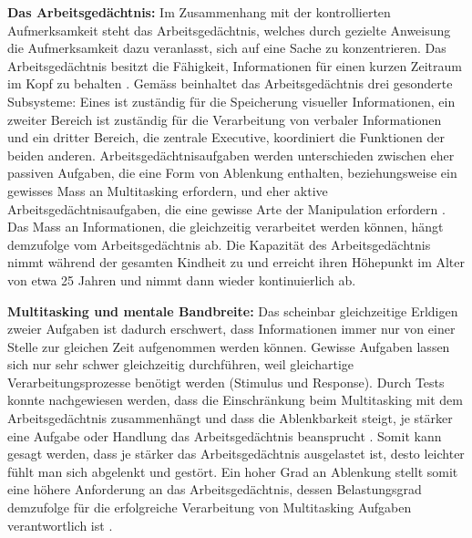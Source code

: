 \par
\textbf{Das Arbeitsgedächtnis:} Im Zusammenhang mit der kontrollierten Aufmerksamkeit steht das Arbeitsgedächtnis, welches durch gezielte Anweisung die Aufmerksamkeit dazu veranlasst, sich auf eine Sache zu konzentrieren. Das Arbeitsgedächtnis besitzt die Fähigkeit, Informationen für einen kurzen Zeitraum im Kopf zu behalten \cite{Klingberg2008}. Gemäss  beinhaltet das Arbeitsgedächtnis drei gesonderte Subsysteme: Eines ist zuständig für die Speicherung visueller Informationen, ein zweiter Bereich ist zuständig für die Verarbeitung von verbaler Informationen und ein dritter Bereich, die zentrale Executive, koordiniert die Funktionen der beiden anderen. Arbeitsgedächtnisaufgaben werden unterschieden zwischen eher passiven Aufgaben, die eine Form von Ablenkung enthalten, beziehungsweise ein gewisses Mass an Multitasking erfordern, und eher aktive Arbeitsgedächtnisaufgaben, die eine gewisse Arte der Manipulation erfordern \cite{Klingberg2008}. Das Mass an Informationen, die gleichzeitig verarbeitet werden können, hängt demzufolge vom Arbeitsgedächtnis ab. Die Kapazität des Arbeitsgedächtnis nimmt während der gesamten Kindheit zu und erreicht ihren Höhepunkt im Alter von etwa 25 Jahren und nimmt dann wieder kontinuierlich ab\cite{Swanson1999}.
\par  
\textbf{Multitasking und mentale Bandbreite:} Das scheinbar gleichzeitige Erldigen zweier Aufgaben ist dadurch erschwert, dass Informationen immer nur von einer Stelle zur gleichen Zeit aufgenommen werden können. Gewisse Aufgaben lassen sich nur sehr schwer gleichzeitig durchführen, weil gleichartige Verarbeitungsprozesse  benötigt werden (Stimulus und Response)\cite{Klingberg2008}. Durch Tests konnte nachgewiesen werden, dass die Einschränkung beim Multitasking mit dem Arbeitsgedächtnis zusammenhängt und dass die Ablenkbarkeit steigt, je stärker eine Aufgabe oder Handlung das Arbeitsgedächtnis beansprucht \cite{Lavie2005}. Somit kann gesagt werden, dass je stärker das Arbeitsgedächtnis ausgelastet ist, desto leichter fühlt man sich abgelenkt und gestört. Ein hoher Grad an Ablenkung stellt somit eine höhere Anforderung an das Arbeitsgedächtnis, dessen Belastungsgrad demzufolge für die erfolgreiche Verarbeitung von Multitasking Aufgaben verantwortlich ist \cite{Klingberg2008}.
\par

